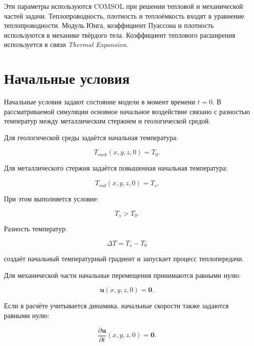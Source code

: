 Эти параметры используются COMSOL при решении тепловой и механической частей задачи. Теплопроводность, плотность и теплоёмкость входят в уравнение теплопроводности. Модуль Юнга, коэффициент Пуассона и плотность используются в механике твёрдого тела. Коэффициент теплового расширения используется в связи \textit{Thermal Expansion}.

\section{Начальные условия}

Начальные условия задают состояние модели в момент времени $t=0$. В рассматриваемой симуляции основное начальное воздействие связано с разностью температур между металлическим стержнем и геологической средой.

Для геологической среды задаётся начальная температура:

\begin{equation}
T_{rock}(x,y,z,0)=T_0.
\end{equation}

Для металлического стержня задаётся повышенная начальная температура:

\begin{equation}
T_{rod}(x,y,z,0)=T_s.
\end{equation}

При этом выполняется условие:

\begin{equation}
T_s>T_0.
\end{equation}

Разность температур:

\begin{equation}
\Delta T=T_s-T_0
\end{equation}

создаёт начальный температурный градиент и запускает процесс теплопередачи.

Для механической части начальные перемещения принимаются равными нулю:

\begin{equation}
\mathbf{u}(x,y,z,0)=\mathbf{0}.
\end{equation}

Если в расчёте учитывается динамика, начальные скорости также задаются равными нулю:

\begin{equation}
\frac{\partial\mathbf{u}}{\partial t}(x,y,z,0)=\mathbf{0}.
\end{equation}

